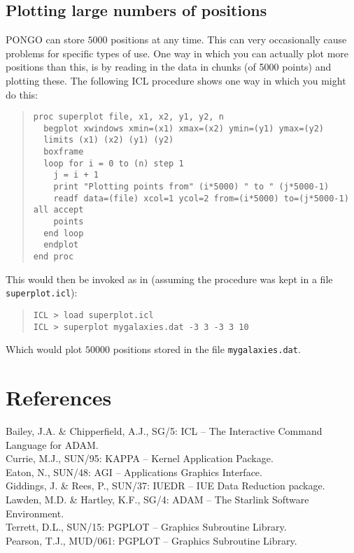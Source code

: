 \documentclass[twoside,11pt]{article}
\newcommand{\xref}[3]{#1}
\renewcommand{\_}{\texttt{\symbol{95}}}
\begin{document}
\subsection{Plotting large numbers of positions}
PONGO can store $5000$ positions at any time. This can very
occasionally cause problems for specific types of use. One way in
which you can actually plot more positions than this, is by reading in
the data in chunks (of 5000 points) and plotting these. The following
ICL procedure shows one way in which you might do this:
\begin{quote}
\begin{verbatim}
proc superplot file, x1, x2, y1, y2, n
  begplot xwindows xmin=(x1) xmax=(x2) ymin=(y1) ymax=(y2)
  limits (x1) (x2) (y1) (y2)
  boxframe
  loop for i = 0 to (n) step 1
    j = i + 1
    print "Plotting points from" (i*5000) " to " (j*5000-1)
    readf data=(file) xcol=1 ycol=2 from=(i*5000) to=(j*5000-1) all accept
    points
  end loop
  endplot
end proc
\end{verbatim}
\end{quote}
This would then be invoked as in (assuming the procedure was kept in a
file \verb+superplot.icl+):
\begin{quote}
\begin{verbatim}
ICL > load superplot.icl
ICL > superplot mygalaxies.dat -3 3 -3 3 10
\end{verbatim}
\end{quote}
Which would plot $50000$ positions stored in the file \verb+mygalaxies.dat+.

\section{References}

\xref{Bailey, J.A. \& Chipperfield, A.J., SG/5: ICL -- The Interactive
Command Language for ADAM.}{sg5}{} \\
\xref{Currie, M.J., SUN/95: KAPPA -- Kernel Application Package.}
{sun95}{}\\
\xref{Eaton, N., SUN/48: AGI -- Applications Graphics Interface.}
{sun48}{}\\
\xref{Giddings, J. \& Rees, P., SUN/37: IUEDR -- IUE Data Reduction
package.}{sun37}{}\\
\xref{Lawden, M.D. \& Hartley, K.F., SG/4: ADAM -- The Starlink Software
Environment.}{sg4}{}\\
\xref{Terrett, D.L., SUN/15: PGPLOT -- Graphics Subroutine
Library.}{sun15}{}\\
Pearson, T.J., MUD/061: PGPLOT -- Graphics Subroutine Library.\\
\end{document}
